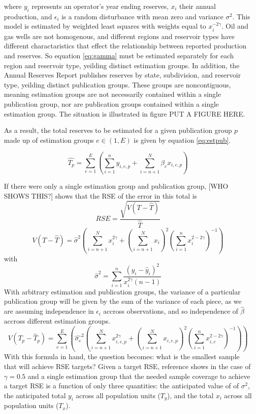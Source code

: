 \documentclass[11pt]{article} %
\begin{document}
where $y_i$ represents an operator's year ending reserves, $x_i$ their annual production, and $\epsilon_i$ is a random disturbance with mean zero and variance $\sigma^2$. This model is estimated by weighted least squares with weights equal to $x_i^{-2\gamma}$.  Oil and gas wells are not homogenous, and different regions and reservoir types have different charactaristics that effect the relationship between reported production and reserves. So equation \ref{eq:gamma} must be estimated separately for each region and reservoir type, yeilding distinct estimation groups. In addition, the Annual Reserves Report publishes reserves by state, subdivision, and reservoir type, yeilding distinct publication groups. These groups are noncontiguous, meaning estimation groups are not necessarily contained within a single publication group, nor are publication groups contained within a single estimation group. The situation is illustrated in figure PUT A FIGURE HERE. 

As a result, the total reserves to be estimated for a given publication group $p$ made up of estimation groups $e\in (1,E)$ is given by equation 
\ref{eq:estpub}.

\begin{equation} \label{eq:estpub}
\hat{T_p}= \sum_{e=1}^{E} \left( \sum_{i=1}^n y_{i,e,p} + \sum_{i=n+1}^N \hat{\beta_e} x_{i,e,p}\right)
\end{equation}

If there were only a single estimation group and publication group, [WHO SHOWS THIS?] shows that the RSE of the error in this total is 
\[
RSE=\frac{\sqrt{V(T-\hat{T})}}{\hat{T}}
\]
\begin{equation} \label{eq:var}
V(T-\hat{T})=\hat{\sigma}^2 \left(   \sum_{i=n+1}^{N} x_i^{2\gamma} + \left(\sum_{i=n+1}^N x_i\right)^2 \left(\sum_{i=1}^n x_i^{2-2\gamma}\right)^{-1}   \right)
\end{equation}
with
\[
\hat{\sigma}^2=\sum_{i=1}^n \frac{(y_i - \hat{y}_i)^2}{x_i^{2 \gamma}(n-1)}
\]
With arbitrary estimation and publication groups, the variance of a particular publication group will be given by the sum of the variance of each piece, as we are assuming independence in $\epsilon_i$ accross observations, and so independence of $\hat{\beta}$ accross different estimation groups.
\begin{equation} \label{eq:pubvar}
V(T_p-\hat{T}_p) = \sum_{e=1}^{E} \left(\hat{\sigma_e}^2 \left(   \sum_{i=n+1}^{N} x_{i,e,p}^{2\gamma} + \left(\sum_{i=n+1}^N x_{i,e,p}\right)^2 \left(\sum_{i=1}^n x_{i,e}^{2-2\gamma}\right)^{-1}   \right) \right)
\end{equation}
With this formula in hand, the question becomes: what is the smallest sample that will achieve RSE targets? Given a target RSE, reference \cite{Knaub2013} shows in the case of $\gamma=0.5$ and a single estimation group that the needed sample coverage to achieve a target RSE is a function of only three quantities: the anticipated value of of $\sigma^2$, the anticipated total $y_i$ across all population units ($T_y$), and the total $x_i$ across all population units ($T_x$). 
\end{document}

